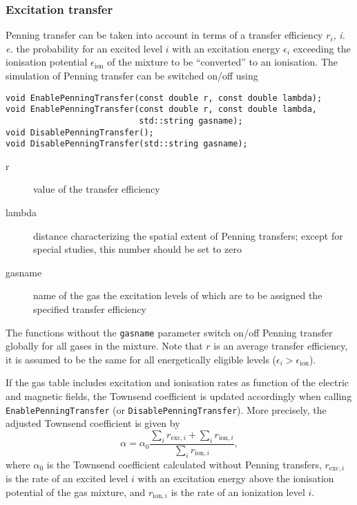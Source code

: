 \subsubsection{Excitation transfer}

Penning transfer can be taken into account in terms of a transfer efficiency 
\(r_{i}\), \textit{i.\,e.} the probability for an excited level \(i\) with an  
excitation energy \(\epsilon_{i}\) exceeding the ionisation potential 
\(\epsilon_{\text{ion}}\) of the mixture to 
be ``converted'' to an ionisation.
The simulation of Penning transfer can be switched on/off using
\begin{lstlisting}
void EnablePenningTransfer(const double r, const double lambda);
void EnablePenningTransfer(const double r, const double lambda, 
                           std::string gasname);
void DisablePenningTransfer();
void DisablePenningTransfer(std::string gasname);
\end{lstlisting}
\begin{description}
  \item[r] value of the transfer efficiency
  \item[lambda] distance characterizing the spatial extent of Penning transfers; 
                except for special studies, this number should be set to zero
  \item[gasname] name of the gas the excitation levels of which are to be assigned 
                 the specified transfer efficiency 
\end{description}
The functions without the \texttt{gasname} parameter
switch on/off Penning transfer globally for all gases in the mixture. 
Note that \(r\) is an average transfer efficiency, it is assumed to be the same 
for all energetically eligible levels (\(\epsilon_{i} > \epsilon_{\text{ion}}\)).

If the gas table includes excitation and ionisation rates as function 
of the electric and magnetic fields, the Townsend coefficient is updated 
accordingly when calling \texttt{EnablePenningTransfer} 
(or \texttt{DisablePenningTransfer}). More precisely,  
the adjusted Townsend coefficient is given by
\begin{equation*}
  \alpha = \alpha_{0} \frac{\sum_{i} r_{\text{exc}, i} + \sum_{i} r_{\text{ion}, i}}{\sum_{i} r_{\text{ion}, i}},
\end{equation*}
where $\alpha_{0}$ is the Townsend coefficient calculated without Penning 
transfers,
$r_{\text{exc}, i}$ is the rate of an excited level $i$ with an excitation 
energy above the ionisation potential of the gas mixture, and 
$r_{\text{ion}, i}$ is the rate of an ionization level $i$.

